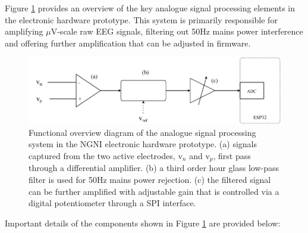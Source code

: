 Figure \ref{fig:analogue-system-c4} provides an overview of the key analogue signal processing elements in the electronic hardware prototype. This system is primarily responsible for amplifying $\mu$V-scale raw EEG signals, filtering out 50Hz mains power interference and offering further amplification that can be adjusted in firmware. 

\begin{figure}
    \centering
    \includegraphics[width=\textwidth]{analogue-system}
    \caption[Functional overview diagram of the analogue signal processing system in the NGNI electronic hardware prototype.]{Functional overview diagram of the analogue signal processing system in the NGNI electronic hardware prototype. (a) signals captured from the two active electrodes, $\textrm{v}_n$ and $\textrm{v}_p$, first pass through a differential amplifier. (b) a third order hour glass low-pass filter is used for 50Hz mains power rejection. (c) the filtered signal can be further amplified with adjustable gain that is controlled via a digital potentiometer through a SPI interface.}
    \label{fig:analogue-system-c4}
\end{figure}

Important details of the components shown in Figure \ref{fig:analogue-system-c4} are provided below:

